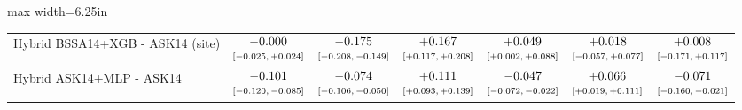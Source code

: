 \begin{table}[htbp]
\begin{adjustbox}{max width=6.25in}
\begin{tabular}{lcccccc}
Hybrid BSSA14+XGB - ASK14 (site) & $\begin{array}{@{}c@{}}-0.000\\[-1pt] \scriptstyle[-0.025,\,+0.024]\end{array}$ & $\begin{array}{@{}c@{}}-0.175\\[-1pt] \scriptstyle[-0.208,\,-0.149]\end{array}$ & $\begin{array}{@{}c@{}}+0.167\\[-1pt] \scriptstyle[+0.117,\,+0.208]\end{array}$ & $\begin{array}{@{}c@{}}+0.049\\[-1pt] \scriptstyle[+0.002,\,+0.088]\end{array}$ & $\begin{array}{@{}c@{}}+0.018\\[-1pt] \scriptstyle[-0.057,\,+0.077]\end{array}$ & $\begin{array}{@{}c@{}}+0.008\\[-1pt] \scriptstyle[-0.171,\,+0.117]\end{array}$ \\
Hybrid ASK14+MLP - ASK14 & $\begin{array}{@{}c@{}}-0.101\\[-1pt] \scriptstyle[-0.120,\,-0.085]\end{array}$ & $\begin{array}{@{}c@{}}-0.074\\[-1pt] \scriptstyle[-0.106,\,-0.050]\end{array}$ & $\begin{array}{@{}c@{}}+0.111\\[-1pt] \scriptstyle[+0.093,\,+0.139]\end{array}$ & $\begin{array}{@{}c@{}}-0.047\\[-1pt] \scriptstyle[-0.072,\,-0.022]\end{array}$ & $\begin{array}{@{}c@{}}+0.066\\[-1pt] \scriptstyle[+0.019,\,+0.111]\end{array}$ & $\begin{array}{@{}c@{}}-0.071\\[-1pt] \scriptstyle[-0.160,\,-0.021]\end{array}$ \\

\end{tabular}
\end{adjustbox}
\end{table}
